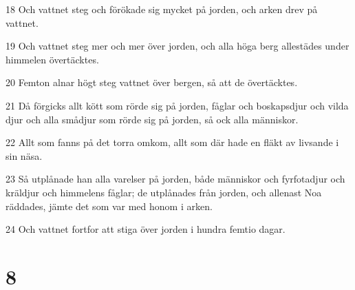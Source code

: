 \par 18 Och vattnet steg och förökade sig mycket på jorden, och arken drev på vattnet.
\par 19 Och vattnet steg mer och mer över jorden, och alla höga berg allestädes under himmelen övertäcktes.
\par 20 Femton alnar högt steg vattnet över bergen, så att de övertäcktes.
\par 21 Då förgicks allt kött som rörde sig på jorden, fåglar och boskapsdjur och vilda djur och alla smådjur som rörde sig på jorden, så ock alla människor.
\par 22 Allt som fanns på det torra omkom, allt som där hade en fläkt av livsande i sin näsa.
\par 23 Så utplånade han alla varelser på jorden, både människor och fyrfotadjur och kräldjur och himmelens fåglar; de utplånades från jorden, och allenast Noa räddades, jämte det som var med honom i arken.
\par 24 Och vattnet fortfor att stiga över jorden i hundra femtio dagar.

\chapter{8}

